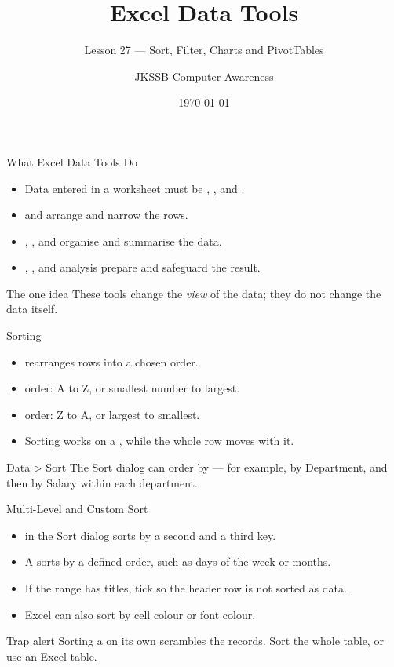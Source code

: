 \documentclass[aspectratio=169]{beamer}
\title{Excel Data Tools}
\subtitle{Lesson 27 --- Sort, Filter, Charts and PivotTables}
\author{JKSSB Computer Awareness}
\date{\today}
\begin{document}
\frame{\titlepage}

\begin{frame}{What Excel Data Tools Do}
  \begin{itemize}
    \item Data entered in a worksheet must be , ,
      and .
    \item {} and  arrange and narrow the rows.
    \item {}, , and  organise and
      summarise the data.
    \item {}, , and  analysis prepare
      and safeguard the result.
  \end{itemize}
  \begin{block}{The one idea}
    These tools change the \emph{view} of the data; they do not change the data
    itself.
  \end{block}
\end{frame}

\begin{frame}{Sorting}
  \begin{itemize}
    \item {} rearranges rows into a chosen order.
    \item {} order: A to Z, or smallest number to largest.
    \item {} order: Z to A, or largest to smallest.
    \item Sorting works on a , while the whole row moves with it.
  \end{itemize}
  \begin{block}{Data > Sort}
    The Sort dialog can order by  --- for example, by
    Department, and then by Salary within each department.
  \end{block}
\end{frame}

\begin{frame}{Multi-Level and Custom Sort}
  \begin{itemize}
    \item {} in the Sort dialog sorts by a second and a third key.
    \item A  sorts by a defined order, such as days of the week
      or months.
    \item If the range has titles, tick  so the header
      row is not sorted as data.
    \item Excel can also sort by cell colour or font colour.
  \end{itemize}
  \begin{alertblock}{Trap alert}
    Sorting a  on its own scrambles the records. Sort the
    whole table, or use an Excel table.
  \end{alertblock}
\end{frame}
\end{document}
